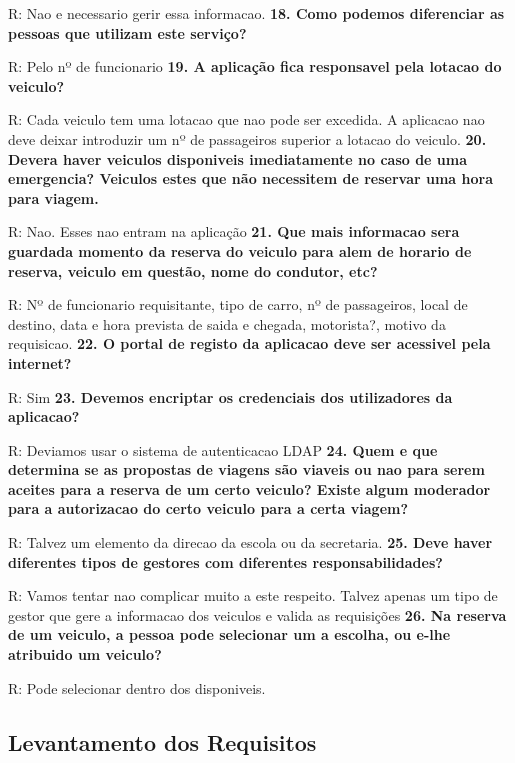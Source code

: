 \documentclass[11pt,a4paper]{report}%
\begin{document}
R: Nao e necessario gerir essa informacao.
\newline
\textbf{18. Como podemos diferenciar as pessoas que utilizam este serviço?}

R: Pelo nº de funcionario
\newline
\textbf{19. A aplicação fica responsavel pela lotacao do veiculo?}

R: Cada veiculo tem uma lotacao que nao pode ser excedida. A aplicacao nao deve deixar introduzir um nº de passageiros superior a lotacao do veiculo.
\newline
\textbf{20. Devera haver veiculos disponiveis imediatamente no caso de uma emergencia?
Veiculos estes que não necessitem de reservar uma hora para viagem.}

R: Nao. Esses nao entram na aplicação
\newline
\textbf{21. Que mais informacao sera guardada momento da reserva do veiculo para alem de horario de reserva, veiculo em questão, nome do condutor, etc?}

R: Nº de funcionario requisitante, tipo de carro, nº de passageiros, local de destino, data e hora prevista de saida e chegada, motorista?, motivo da requisicao.
\newline
\textbf{22. O portal de registo da aplicacao deve ser acessivel pela internet?}

R: Sim
\newline
\textbf{23. Devemos encriptar os credenciais dos utilizadores da aplicacao?}

R: Deviamos usar o sistema de autenticacao LDAP
\newline
\textbf{24. Quem e que determina se as propostas de viagens são viaveis ou nao para serem aceites para a reserva de um certo veiculo? Existe algum moderador para a autorizacao do certo veiculo para a certa viagem?}

R: Talvez um elemento da direcao da escola ou da secretaria.
\newline
\textbf{25. Deve haver diferentes tipos de gestores com diferentes responsabilidades?}

R: Vamos tentar nao complicar muito a este respeito. Talvez apenas um tipo de gestor que gere a informacao dos veiculos e valida as requisições
\newpage
\textbf{26. Na reserva de um veiculo, a pessoa pode selecionar um a escolha, ou e-lhe atribuido um veiculo?}

R: Pode selecionar dentro dos disponiveis.
\newline
\subsection{Levantamento dos Requisitos}
\end{document}
